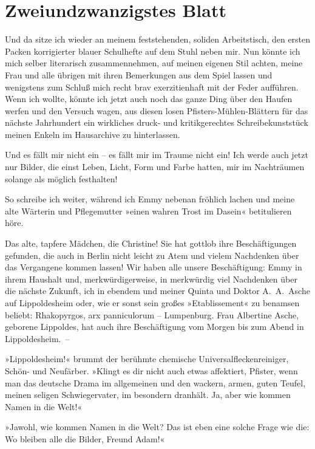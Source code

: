 \section{Zweiundzwanzigstes Blatt}

Und da sitze ich wieder an meinem feststehenden, soliden
Arbeitstisch, den ersten Packen korrigierter blauer Schulhefte auf
dem Stuhl neben mir. Nun könnte ich mich selber literarisch
zusammennehmen, auf meinen eigenen Stil achten, meine Frau und alle
übrigen mit ihren Bemerkungen aus dem Spiel lassen und wenigstens
zum Schluß mich recht brav exerzitienhaft mit der Feder aufführen.
Wenn ich wollte, könnte ich jetzt auch noch das ganze Ding über den
Haufen werfen und den Versuch wagen, aus diesen losen
Pfisters-Mühlen-Blättern für das nächste Jahrhundert ein wirkliches
druck- und kritikgerechtes Schreibekunststück meinen Enkeln im
Hausarchive zu hinterlassen.

Und es fällt mir nicht ein – es fällt mir im Traume nicht ein! Ich
werde auch jetzt nur Bilder, die einst Leben, Licht, Form und Farbe
hatten, mir im Nachträumen solange als möglich festhalten!

So schreibe ich weiter, während ich Emmy nebenan fröhlich lachen
und meine alte Wärterin und Pflegemutter »einen wahren Trost im
Dasein« betitulieren höre.

Das alte, tapfere Mädchen, die Christine! Sie hat gottlob ihre
Beschäftigungen gefunden, die auch in Berlin nicht leicht zu Atem
und vielem Nachdenken über das Vergangene kommen lassen! Wir haben
alle unsere Beschäftigung: Emmy in ihrem Haushalt und,
merkwürdigerweise, in merkwürdig viel Nachdenken über die nächste
Zukunft, ich in ebendem und meiner Quinta und Doktor A.~A.~Asche
auf Lippoldesheim oder, wie er sonst sein großes »Etablissement« zu
benamsen beliebt: Rhakopyrgos, arx panniculorum – Lumpenburg. Frau
Albertine Asche, geborene Lippoldes, hat auch ihre Beschäftigung
vom Morgen bis zum Abend in Lippoldesheim.~–

»Lippoldesheim!« brummt der berühmte chemische
Universalfleckenreiniger, Schön- und Neufärber. »Klingt es dir
nicht auch etwas affektiert, Pfister, wenn man das deutsche Drama
im allgemeinen und den wackern, armen, guten Teufel, meinen seligen
Schwiegervater, im besondern dranhält. Ja, aber wie kommen Namen in
die Welt!«

»Jawohl, wie kommen Namen in die Welt? Das ist eben eine solche
Frage wie die: Wo bleiben alle die Bilder, Freund Adam!«

